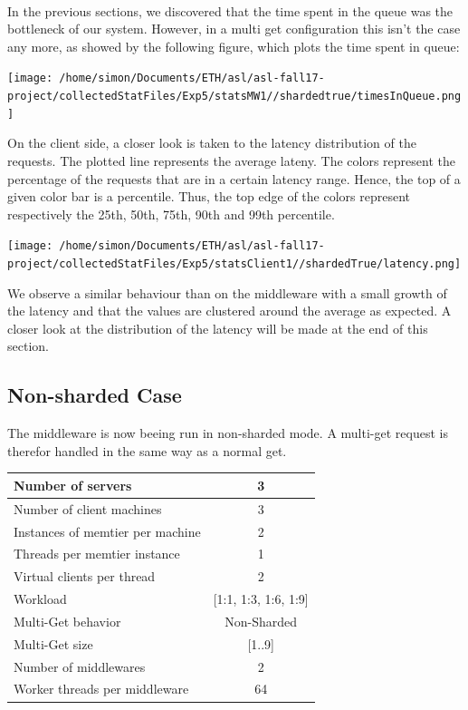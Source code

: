 \documentclass[11pt,a4paper]{article}
\begin{document}
\\
In the previous sections, we discovered that the time spent in the queue was the bottleneck of our system. However, in a multi get configuration this isn't the case any more, as showed by the following figure, which plots the time spent in queue:  
 \begin{center}
\texttt{[image: /home/simon/Documents/ETH/asl/asl-fall17-project/collectedStatFiles/Exp5/statsMW1//shardedtrue/timesInQueue.png]}
\end{center}


On the client side, a closer look is taken to the latency distribution of the requests. The plotted line represents the average lateny. The colors represent the percentage of the requests that are in a certain latency range. Hence, the top of a given color bar is a percentile. Thus, the top edge of the colors represent respectively the 25th, 50th, 75th, 90th and 99th percentile. 
  
 \begin{center}
\texttt{[image: /home/simon/Documents/ETH/asl/asl-fall17-project/collectedStatFiles/Exp5/statsClient1//shardedTrue/latency.png]}
\end{center}

We observe a similar behaviour than on the middleware with a small growth of the latency and that the values are clustered around the average as expected. A closer look at the distribution of the latency will be made at the end of this section. 

\subsection{Non-sharded Case}

The middleware is now beeing run in non-sharded mode. A multi-get request is therefor handled in the same way as a normal get. 

\begin{center}
	\scriptsize{
		\begin{tabular}{|l|c|}
			\hline Number of servers                & 3                       \\ 
			\hline Number of client machines        & 3                       \\ 
			\hline Instances of memtier per machine & 2                       \\ 
			\hline Threads per memtier instance     & 1                       \\
			\hline Virtual clients per thread       & 2                		 \\ 
			\hline Workload                         & [1:1, 1:3, 1:6, 1:9]             \\
			\hline Multi-Get behavior               & Non-Sharded             \\
			\hline Multi-Get size                   & [1..9]                  \\
			\hline Number of middlewares            & 2                       \\
			\hline Worker threads per middleware    & 64 \\
			\hline 
		\end{tabular}
	} 
\end{center}
\end{document}
